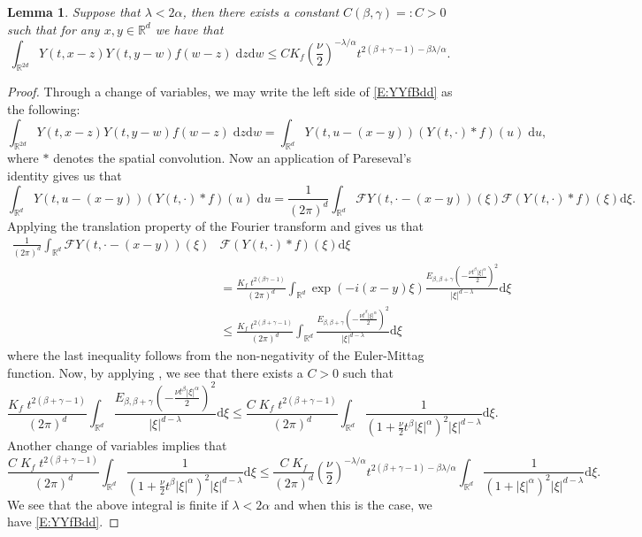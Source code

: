 \documentclass[a4paper,11pt]{article}
\numberwithin{equation}{section}
\theoremstyle{plain}
\newtheorem{lemma}[theorem]{Lemma}
\theoremstyle{definition}
\newcommand{\ud}{\ensuremath{\mathrm{d} }}
\newcommand{\R}{\mathbb{R}}
\numberwithin{NQ}{section}
\numberwithin{LQ}{section}
\numberwithin{ZQ}{section}
\begin{document}
	\begin{lemma}
		\label{L:intYfYbdd}
		Suppose that $\lambda < 2\alpha$, then there exists a constant $C(\beta,\gamma) =: C >0$ such that for any $x,y \in \R^d$ we have that 
		\begin{equation}
		\label{E:YYfBdd}
		\int_{\R^{2d}} Y(t,x-z)Y(t,y-w)f(w-z) \; \ud z \ud w \le C K_f \left( \frac{\nu}{2} \right)^{-\lambda / \alpha} t^{2(\beta + \gamma -1)-\beta \lambda / \alpha}.
		\end{equation}
	\end{lemma}
	\begin{proof}
		Through a change of variables, we may write the left side of \eqref{E:YYfBdd} as the following:
		\[
		\int_{\R^{2d}} Y(t,x-z)Y(t,y-w)f(w-z) \; \ud z \ud w = \int_{\R^{d}} Y\left(t,u-(x-y)\right)(Y(t,\cdot)*f)(u) \; \ud u,
		\]
		where $*$ denotes the spatial convolution. Now an application of Pareseval's identity gives us that 
		\[
		\int_{\R^{d}} Y\left(t,u-(x-y)\right)(Y(t,\cdot)*f)(u) \; \ud u = \frac{1}{(2\pi)^d} 	\int_{\R^{d}} \mathcal{F}Y\left(t,\cdot-(x-y)\right)(\xi) \mathcal{F}(Y(t,\cdot)*f)(\xi) \ud \xi.
		\]
		Applying the translation property of the Fourier transform and \cite[Theorem 4.1]{CHN19} gives us that 
		\begin{align*}
		\frac{1}{(2\pi)^d} 	\int_{\R^{d}} \mathcal{F}Y\left(t,\cdot-(x-y)\right)(\xi) & \mathcal{F}(Y(t,\cdot)*f)(\xi) \ud \xi \\
		& = \frac{ K_f \; t^{2(\beta  \gamma -1)} }{ (2\pi)^d } \int_{\R^{d}} \exp(-i(x-y)\xi) \frac{E_{\beta,\beta+\gamma}\left(-\frac{\nu t^\beta |\xi|^\alpha}{2}\right)^2}{|\xi|^{d-\lambda}} \ud \xi \\
		& \le \frac{K_f \; t^{2(\beta + \gamma -1)}  }{ (2\pi)^d } \int_{\R^{d}}  \frac{E_{\beta,\beta+\gamma}\left(-\frac{\nu t^\beta |\xi|^\alpha}{2}\right)^2}{|\xi|^{d-\lambda}} \ud \xi
		\end{align*}
		where the last inequality follows from the non-negativity of the Euler-Mittag function. Now, by applying \cite[Theorem 1.6]{Podlubny99}, we see that there exists a $C>0$ such that 
		\[
		\frac{K_f \; t^{2(\beta + \gamma -1)}  }{ (2\pi)^d } \int_{\R^{d}}  \frac{E_{\beta,\beta+\gamma}\left(-\frac{\nu t^\beta |\xi|^\alpha}{2}\right)^2}{|\xi|^{d-\lambda}} \ud \xi \le 
		\frac{C\; K_f \; t^{2(\beta + \gamma -1)}  }{ (2\pi)^d } \int_{\R^{d}}  \frac{ 1 }{\left(1+ \frac{\nu}{2} t^\beta |\xi|^\alpha \right)^2 |\xi|^{d-\lambda} } \ud \xi.
		\]
		Another change of variables implies that 
		\[
		\frac{C\; K_f \; t^{2(\beta + \gamma -1)}  }{ (2\pi)^d } \int_{\R^{d}}  \frac{ 1 }{\left(1+ \frac{\nu}{2} t^\beta |\xi|^\alpha\right)^2 |\xi|^{d-\lambda}} \ud \xi \le 
		\frac{C\; K_f }{ (2\pi)^d } \left(\frac{\nu}{2}\right)^{-\lambda/\alpha}  t^{2(\beta + \gamma -1)-\beta \lambda/\alpha} \int_{\R^{d}}  \frac{ 1 }{\left(1+ |\xi|^\alpha\right)^2 |\xi|^{d-\lambda}} \ud \xi.
		\]
		We see that the above integral is finite if $\lambda < 2\alpha$ and when this is the case, we have \eqref{E:YYfBdd}.
	\end{proof}
\end{document}
